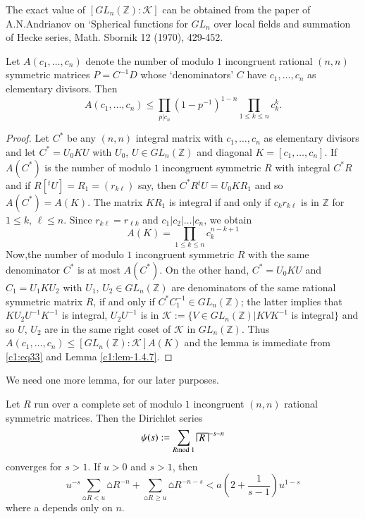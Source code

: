 The exact value of $[GL_{n}(\mathbb{Z}):\mathscr{K}]$ can be obtained
from the paper of A.N.\@ Andrianov on `Spherical functions for
$GL_{n}$ over local fields and summation of Hecke series, Math.\@
Sbornik 12 (1970), 429-452.

\begin{sublemma}\label{c1:lem-1.4.8}
Let $A(c_{1},\ldots,c_{n})$ denote the number of modulo $1$
incongruent rational $(n,n)$ symmetric matrices $P=C^{-1}D$ whose
`denominators' $C$ have $c_{1},\ldots,c_{n}$ as elementary
divisors. Then
$$
A(c_{1},\ldots,c_{n})\leq \prod_{p|c_{n}}(1-p^{-1})^{1-n}\prod_{1\leq
  k\leq n}c^{k}_{k}.
$$
\end{sublemma}


\begin{proof}
Let $C^{\ast}$ be any $(n,n)$ integral matrix with
$c_{1},\ldots,c_{n}$ as elementary divisors and let $C^{\ast}=U_{0}KU$
with $U_{0}$, $U\in GL_{n}(\mathbb{Z})$ and diagonal
$K=[c_{1},\ldots,c_{n}]$. If $A(C^{\ast})$ is the number of modulo $1$
incongruent symmetric $R$ with integral $C^{\ast}R$ and if
$R[{}^{t}U]=R_{1}=(r_{k\ell})$ say, then
$C^{\ast}R{}^{t}U=U_{0}KR_{1}$ and so $A(C^{\ast})=A(K)$. The matrix
$KR_{1}$ is integral if and only if $c_{k}r_{k\ell}$ is in
$\mathbb{Z}$ for $1\leq k$, $\ell\leq n$. Since $r_{k\ell}=r_{\ell k}$
and $c_{1}|c_{2}|\ldots|c_{n}$, we obtain
\begin{equation*}
A(K)=\prod_{1\leq k\leq n}c^{n-k+1}_{k}\tag{33}\label{c1:eq33}
\end{equation*}
Now,\pageoriginale the number of modulo $1$ incongruent symmetric $R$
with the same denominator $C^{\ast}$ is at most $A(C^{\ast})$. On the
other hand, $C^{\ast}=U_{0}KU$ and $C_{1}=U_{1}KU_{2}$ with $U_{1}$,
$U_{2}\in GL_{n}(\mathbb{Z})$ are denominators of the same rational
symmetric matrix $R$, if and only if $C^{\ast}C^{-1}_{1}\in
GL_{n}(\mathbb{Z})$; the latter implies that $KU_{2}U^{-1}K^{-1}$ is
integral, $U_{2}U^{-1}$ is in $\mathscr{K}:=\{V\in
GL_{n}(\mathbb{Z})|KVK^{-1}$ is integral$\}$ and so $U$, $U_{2}$ are
in the same right coset of $\mathscr{K}$ in $GL_{n}(\mathbb{Z})$. Thus
$A(c_{1},\ldots,c_{n})\leq [GL_{n}(\mathbb{Z}):\mathscr{K}]A(K)$ and
the lemma is immediate from \eqref{c1:eq33} and Lemma \ref{c1:lem-1.4.7}.
\end{proof}

We need one more lemma, for our later purposes.

\begin{sublemma}\label{c1:lem-1.4.9}
Let $R$ run over a complete set of modulo $1$ incongruent $(n,n)$
rational symmetric matrices. Then the Dirichlet series
$$
\psi(s):=\sum_{R\rm{mod} \; 1}\house{R}^{-s-n}
$$
converges for $s>1$. If $u>0$ and $s>1$, then 
$$
u^{-s}\sum_{\house{R}<u}{\house{R}}^{-n}+\sum_{\house{R}\geq
  u}{\house{R}}^{-n-s}<a\left(2+\frac{1}{s-1}\right)u^{1-s} 
$$
where a depends only on $n$.
\end{sublemma}

